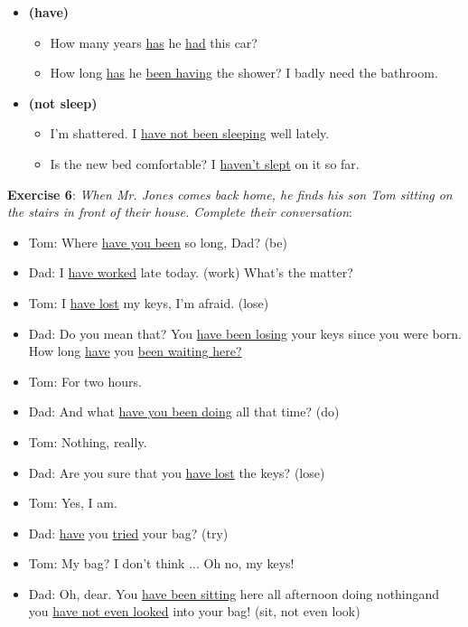 \begin{itemize}
\item\textbf{(have)}
\begin{itemize}
\item How many years \underline{has} he \underline{had} this car?
\item How long \underline{has} he \underline{been having} the shower? I badly need the bathroom.
\end{itemize}

\item\textbf{(not sleep)}
\begin{itemize}
\item I'm shattered. I \underline{have not been sleeping} well lately.
\item Is the new bed comfortable? I \underline{haven't slept} on it so far.
\end{itemize}

\end{itemize}

\textbf{Exercise 6}: \textit{When Mr. Jones comes back home, he finds his son Tom sitting on the stairs in front of their house. Complete their conversation}:

\begin{itemize}

\item Tom: Where \underline{have you been} so long, Dad? (be)
\item Dad: I \underline{have worked} late today. (work) What's the matter? 
\item Tom: I \underline{have lost} my keys, I'm afraid. (lose)
\item Dad: Do you mean that? You \underline{have been losing} your keys since you were born. How long \underline{have} you \underline{been waiting here?}
\item Tom: For two hours.
\item Dad: And what \underline{have you been doing} all that time? (do)
\item Tom: Nothing, really.
\item Dad: Are you sure that you \underline{have lost} the keys? (lose)
\item Tom: Yes, I am.
\item Dad: \underline{have} you \underline{tried} your bag? (try)
\item Tom: My bag? I don't think ... Oh no, my keys!
\item Dad: Oh, dear. You \underline{have been sitting} here all afternoon doing nothing\newline and you \underline{have not even looked} into your bag! (sit, not even look)

\end{itemize}

